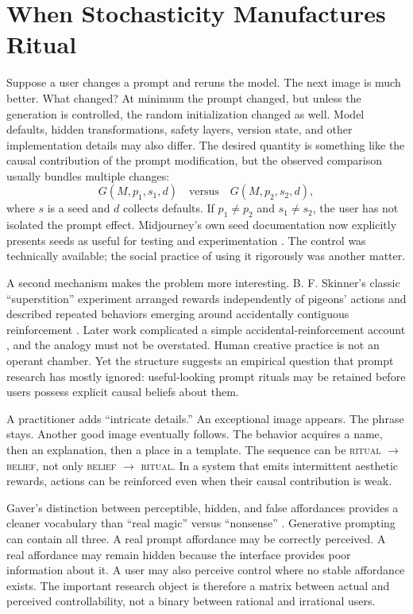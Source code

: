 \documentclass[11pt]{article}
\newcommand{\term}[1]{\textsc{#1}}
\begin{document}
\section{When Stochasticity Manufactures Ritual}

Suppose a user changes a prompt and reruns the model. The next image is much better. What changed? At minimum the prompt changed, but unless the generation is controlled, the random initialization changed as well. Model defaults, hidden transformations, safety layers, version state, and other implementation details may also differ. The desired quantity is something like the causal contribution of the prompt modification, but the observed comparison usually bundles multiple changes:
\[
G(M,p_1,s_1,d) \quad \text{versus} \quad G(M,p_2,s_2,d),
\]
where $s$ is a seed and $d$ collects defaults. If $p_1 \neq p_2$ and $s_1 \neq s_2$, the user has not isolated the prompt effect. Midjourney's own seed documentation now explicitly presents seeds as useful for testing and experimentation \parencite{midjourneySeeds}. The control was technically available; the social practice of using it rigorously was another matter.

A second mechanism makes the problem more interesting. B. F. Skinner's classic ``superstition'' experiment arranged rewards independently of pigeons' actions and described repeated behaviors emerging around accidentally contiguous reinforcement \parencite{skinner1948superstition}. Later work complicated a simple accidental-reinforcement account \parencite{staddon1971superstition}, and the analogy must not be overstated. Human creative practice is not an operant chamber. Yet the structure suggests an empirical question that prompt research has mostly ignored: useful-looking prompt rituals may be retained before users possess explicit causal beliefs about them.

A practitioner adds ``intricate details.'' An exceptional image appears. The phrase stays. Another good image eventually follows. The behavior acquires a name, then an explanation, then a place in a template. The sequence can be \term{ritual $\rightarrow$ belief}, not only \term{belief $\rightarrow$ ritual}. In a system that emits intermittent aesthetic rewards, actions can be reinforced even when their causal contribution is weak.

Gaver's distinction between perceptible, hidden, and false affordances provides a cleaner vocabulary than ``real magic'' versus ``nonsense'' \parencite{gaver1991technology}. Generative prompting can contain all three. A real prompt affordance may be correctly perceived. A real affordance may remain hidden because the interface provides poor information about it. A user may also perceive control where no stable affordance exists. The important research object is therefore a matrix between actual and perceived controllability, not a binary between rational and irrational users.
\end{document}

